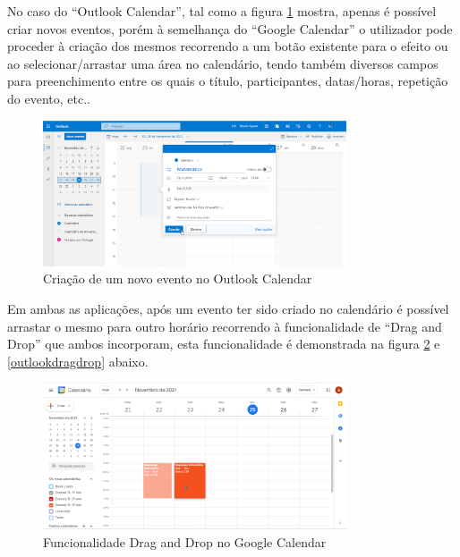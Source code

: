 \documentclass[11pt, twoside]{report}
\begin{document}
	No caso do ``Outlook Calendar'', tal como a figura \ref{outlookevento} mostra, apenas é possível criar novos eventos, porém à semelhança do ``Google Calendar'' o utilizador pode proceder à criação dos mesmos recorrendo a um botão existente para o efeito ou ao selecionar/arrastar uma área no calendário, tendo também diversos campos para preenchimento entre os quais o título, participantes, datas/horas, repetição do evento, etc..
	
	\begin{figure}[H] 
		\centering
		\includegraphics[width=0.8\textwidth,height=0.8\textheight,keepaspectratio]{image/estadodearte/criacao_evento_outlook}
		\caption{Criação de um novo evento no Outlook Calendar}
		\label{outlookevento}
	\end{figure}
	
	Em ambas as aplicações, após um evento ter sido criado no calendário é possível arrastar o mesmo para outro horário recorrendo à funcionalidade de ``Drag and Drop'' que ambos incorporam, esta funcionalidade é demonstrada na figura \ref{googledragdrop} e \ref{outlookdragdrop} abaixo.\\
	
	\begin{figure}[H] 
		\centering
		\includegraphics[width=0.8\textwidth,height=0.8\textheight,keepaspectratio]{image/estadodearte/drag_drop_google}
		\caption{Funcionalidade Drag and Drop no Google Calendar}
		\label{googledragdrop}
	\end{figure}
	
\end{document}
